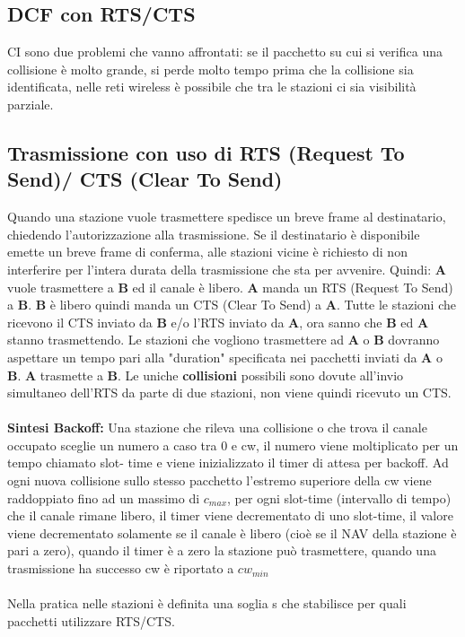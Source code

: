 \documentclass{article}
\begin{document}
\subsection{DCF con RTS/CTS}
CI sono due problemi che vanno affrontati: se il pacchetto su cui si verifica una collisione è molto grande, si perde molto tempo prima che la collisione sia identificata, nelle reti wireless è possibile che tra le stazioni ci sia visibilità parziale.
\subsection{Trasmissione con uso di RTS (Request To Send)/ CTS (Clear To Send)}
Quando una stazione vuole trasmettere spedisce un breve frame al destinatario, chiedendo l'autorizzazione alla trasmissione. Se il destinatario è disponibile emette un breve frame di conferma, alle stazioni vicine è richiesto di non interferire per l'intera durata della trasmissione che sta per avvenire. Quindi:
\textbf{A} vuole trasmettere a \textbf{B} ed il canale è libero. \textbf{A} manda un RTS (Request To Send) a \textbf{B}. \textbf{B} è libero quindi manda un CTS (Clear To Send) a \textbf{A}. Tutte le stazioni che ricevono il CTS inviato da \textbf{B} e/o l'RTS inviato da \textbf{A}, ora sanno che \textbf{B} ed \textbf{A} stanno trasmettendo. Le stazioni che vogliono trasmettere ad \textbf{A} o \textbf{B} dovranno aspettare un tempo pari alla "duration" specificata nei pacchetti inviati da \textbf{A} o \textbf{B}. \textbf{A} trasmette a \textbf{B}. Le uniche \textbf{collisioni} possibili sono dovute all'invio simultaneo dell'RTS da parte di due stazioni, non viene quindi ricevuto un CTS.\\\\
\textbf{Sintesi Backoff:}
Una stazione che rileva una collisione o che trova il canale occupato sceglie un numero a caso tra 0 e cw, il numero viene moltiplicato per un tempo chiamato slot- time e viene inizializzato il timer di attesa per backoff. Ad ogni nuova collisione sullo stesso pacchetto l’estremo superiore della cw viene raddoppiato fino ad un massimo di $c_{max}$, per ogni slot-time (intervallo di tempo) che il canale rimane
libero, il timer viene decrementato di uno slot-time, il valore viene decrementato solamente se il canale è libero (cioè se il NAV della stazione è pari a zero), quando il timer è a zero la stazione può trasmettere, quando una trasmissione ha successo cw è riportato a $cw_{min}$\\\\
Nella pratica nelle stazioni è definita una soglia s che stabilisce per quali pacchetti utilizzare RTS/CTS.
\end{document}
